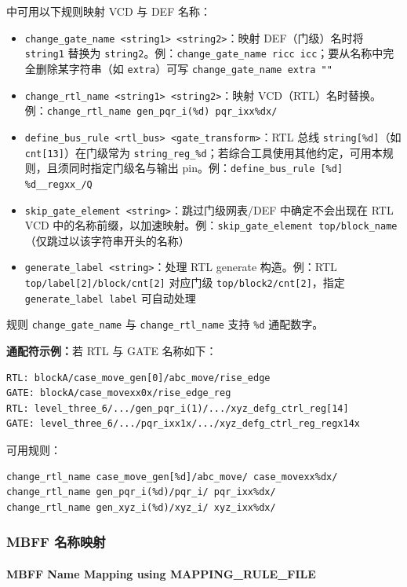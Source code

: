  中可用以下规则映射 VCD 与 DEF 名称：
\begin{itemize}
  \item \texttt{change\_gate\_name <string1> <string2>}：映射 DEF（门级）名时将 \texttt{string1} 替换为 \texttt{string2}。例：\texttt{change\_gate\_name ricc icc}；要从名称中完全删除某字符串（如 \texttt{extra}）可写 \texttt{change\_gate\_name extra ""}
  \item \texttt{change\_rtl\_name <string1> <string2>}：映射 VCD（RTL）名时替换。例：\texttt{change\_rtl\_name gen\_pqr\_i(\%d) pqr\_ixx\%dx/}
  \item \texttt{define\_bus\_rule <rtl\_bus> <gate\_transform>}：RTL 总线 \texttt{string[\%d]}（如 \texttt{cnt[13]}）在门级常为 \texttt{string\_reg\_\%d}；若综合工具使用其他约定，可用本规则，且须同时指定门级名与输出 pin。例：\texttt{define\_bus\_rule [\%d] \%d\_\_regxx\_/Q}
  \item \texttt{skip\_gate\_element <string>}：跳过门级网表/DEF 中确定不会出现在 RTL VCD 中的名称前缀，以加速映射。例：\texttt{skip\_gate\_element top/block\_name}（仅跳过以该字符串开头的名称）
  \item \texttt{generate\_label <string>}：处理 RTL generate 构造。例：RTL \texttt{top/label[2]/block/cnt[2]} 对应门级 \texttt{top/block2/cnt[2]}，指定 \texttt{generate\_label label} 可自动处理
\end{itemize}

规则 \texttt{change\_gate\_name} 与 \texttt{change\_rtl\_name} 支持 \texttt{\%d} 通配数字。

\textbf{通配符示例：}若 RTL 与 GATE 名称如下：
\begin{verbatim}
RTL: blockA/case_move_gen[0]/abc_move/rise_edge
GATE: blockA/case_movexx0x/rise_edge_reg
RTL: level_three_6/.../gen_pqr_i(1)/.../xyz_defg_ctrl_reg[14]
GATE: level_three_6/.../pqr_ixx1x/.../xyz_defg_ctrl_reg_regx14x
\end{verbatim}
可用规则：
\begin{lstlisting}
change_rtl_name case_move_gen[%d]/abc_move/ case_movexx%dx/
change_rtl_name gen_pqr_i(%d)/pqr_i/ pqr_ixx%dx/
change_rtl_name gen_xyz_i(%d)/xyz_i/ xyz_ixx%dx/
\end{lstlisting}

\subsubsection{MBFF 名称映射}
\paragraph*{MBFF Name Mapping using MAPPING\_RULE\_FILE}

